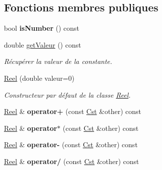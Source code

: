 \subsection*{Fonctions membres publiques}
\begin{DoxyCompactItemize}
\item 
\hypertarget{classcalcul_1_1_reel_ae506e14392d2949f515c6371b8c99966}{bool {\bfseries is\-Number} () const }\label{classcalcul_1_1_reel_ae506e14392d2949f515c6371b8c99966}

\item 
double \hyperlink{classcalcul_1_1_reel_a6412ad4d84dcd302c1fae1f7ec3ede46}{get\-Valeur} () const 
\begin{DoxyCompactList}\small\item\em Récupérer la valeur de la constante. \end{DoxyCompactList}\item 
\hyperlink{classcalcul_1_1_reel_a280d3cbf64344c09f6a4a652fcab3463}{Reel} (double valeur=0)
\begin{DoxyCompactList}\small\item\em Constructeur par défaut de la classe \hyperlink{classcalcul_1_1_reel}{Reel}. \end{DoxyCompactList}\item 
\hypertarget{classcalcul_1_1_reel_a1538ddbfb6025e198b677a94458da685}{\hyperlink{classcalcul_1_1_reel}{Reel} \& {\bfseries operator+} (const \hyperlink{classcalcul_1_1_cst}{Cst} \&other) const }\label{classcalcul_1_1_reel_a1538ddbfb6025e198b677a94458da685}

\item 
\hypertarget{classcalcul_1_1_reel_a9a0cc280b8a1b31c312cd9a607e0ca6f}{\hyperlink{classcalcul_1_1_reel}{Reel} \& {\bfseries operator$\ast$} (const \hyperlink{classcalcul_1_1_cst}{Cst} \&other) const }\label{classcalcul_1_1_reel_a9a0cc280b8a1b31c312cd9a607e0ca6f}

\item 
\hypertarget{classcalcul_1_1_reel_a6429fb315d620acec8c79852a6f25a6f}{\hyperlink{classcalcul_1_1_reel}{Reel} \& {\bfseries operator-\/} (const \hyperlink{classcalcul_1_1_cst}{Cst} \&other) const }\label{classcalcul_1_1_reel_a6429fb315d620acec8c79852a6f25a6f}

\item 
\hypertarget{classcalcul_1_1_reel_ae7131d5efb1995804fdcf3ac9c201540}{\hyperlink{classcalcul_1_1_reel}{Reel} \& {\bfseries operator/} (const \hyperlink{classcalcul_1_1_cst}{Cst} \&other) const }\label{classcalcul_1_1_reel_ae7131d5efb1995804fdcf3ac9c201540}


\end{DoxyCompactItemize}
